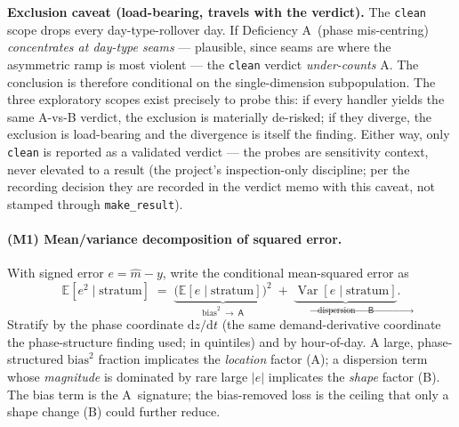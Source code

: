 \documentclass[11pt]{article}
\newcommand{\E}{\mathbb{E}}
\newcommand{\Var}{\operatorname{Var}}
\newcommand{\defA}{\textsf{A}}
\newcommand{\defB}{\textsf{B}}
\begin{document}
\noindent\textbf{Exclusion caveat (load-bearing, travels with the
verdict).} The \texttt{clean} scope drops every day-type-rollover day.
If Deficiency \defA\ (phase mis-centring) \emph{concentrates at
day-type seams} --- plausible, since seams are where the asymmetric
ramp is most violent --- the \texttt{clean} verdict \emph{under-counts}
\defA. The conclusion is therefore conditional on the single-dimension
subpopulation. The three exploratory scopes exist precisely to probe
this: if every handler yields the same A-vs-B verdict, the exclusion is
materially de-risked; if they diverge, the exclusion is load-bearing
and the divergence is itself the finding. Either way, only
\texttt{clean} is reported as a validated verdict --- the probes are
sensitivity context, never elevated to a result (the project's
inspection-only discipline; per the recording decision they are recorded
in the verdict memo with this caveat, not stamped through
\texttt{make\_result}).

\paragraph{(M1) Mean/variance decomposition of squared error.}
With signed error $e=\widehat{m}-y$, write the conditional mean-squared
error as
\[
  \E[e^2 \mid \text{stratum}]
   \;=\; \underbrace{\big(\E[e\mid\text{stratum}]\big)^2}_{\text{bias}^2\ \to\ \defA}
   \;+\; \underbrace{\Var[e\mid\text{stratum}]}_{\text{dispersion}\ \to\ \defB}.
\]
Stratify by the phase coordinate $\mathrm{d}z/\mathrm{d}t$ (the same
demand-derivative coordinate the phase-structure finding used; in
quintiles) and by hour-of-day. A large,
phase-structured $\mathrm{bias}^2$ fraction implicates the
\emph{location} factor (\defA); a dispersion term whose \emph{magnitude}
is dominated by rare large $|e|$ implicates the \emph{shape} factor
(\defB). The bias term is the \defA\ signature; the bias-removed loss is
the ceiling that only a shape change (\defB) could further reduce.
\end{document}
